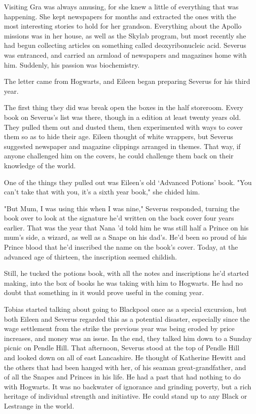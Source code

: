 \documentclass[a4paper,11pt]{article}
\begin{document}
Visiting Gra was always amusing, for she knew a little of everything that was happening. She kept newspapers for months and extracted the ones with the most interesting stories to hold for her grandson. Everything about the Apollo missions was in her house, as well as the Skylab program, but most recently she had begun collecting articles on something called deoxyribonucleic acid. Severus was entranced, and carried an armload of newspapers and magazines home with him. Suddenly, his passion was biochemistry.

The letter came from Hogwarts, and Eileen began preparing Severus for his third year.

The first thing they did was break open the boxes in the half storeroom. Every book on Severus's list was there, though in a edition at least twenty years old. They pulled them out and dusted them, then experimented with ways to cover them so as to hide their age. Eileen thought of white wrappers, but Severus suggested newspaper and magazine clippings arranged in themes. That way, if anyone challenged him on the covers, he could challenge them back on their knowledge of the world.

One of the things they pulled out was Eileen's old `Advanced Potions' book. "You can't take that with you, it's a sixth year book," she chided him.

"But Mum, I was using this when I was nine," Severus responded, turning the book over to look at the signature he'd written on the back cover four years earlier. That was the year that Nana 'd told him he was still half a Prince on his mum's side, a wizard, as well as a Snape on his dad's. He'd been so proud of his Prince blood that he'd inscribed the name on the book's cover. Today, at the advanced age of thirteen, the inscription seemed childish.

Still, he tucked the potions book, with all the notes and inscriptions he'd started making, into the box of books he was taking with him to Hogwarts. He had no doubt that something in it would prove useful in the coming year.

Tobias started talking about going to Blackpool once as a special excursion, but both Eileen and Severus regarded this as a potential disaster, especially since the wage settlement from the strike the previous year was being eroded by price increases, and money was an issue. In the end, they talked him down to a Sunday picnic on Pendle Hill. That afternoon, Severus stood at the top of Pendle Hill and looked down on all of east Lancashire. He thought of Katherine Hewitt and the others that had been hanged with her, of his seaman great-grandfather, and of all the Snapes and Princes in his life. He had a past that had nothing to do with Hogwarts. It was no backwater of ignorance and grinding poverty, but a rich heritage of individual strength and initiative. He could stand up to any Black or Lestrange in the world.
\end{document}

